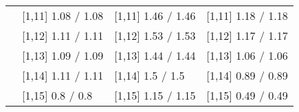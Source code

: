\begin{table}
\begin{tabular}[t]{llll}
 & {}[1,11] 1.08  / 1.08 & {}[1,11] 1.46  / 1.46 & {}[1,11] 1.18  / 1.18\\
 & {}[1,12] 1.11  / 1.11 & {}[1,12] 1.53  / 1.53 & {}[1,12] 1.17  / 1.17\\
\addlinespace
 & {}[1,13] 1.09  / 1.09 & {}[1,13] 1.44  / 1.44 & {}[1,13] 1.06  / 1.06\\
 & {}[1,14] 1.11  / 1.11 & {}[1,14] 1.5  / 1.5 & {}[1,14] 0.89  / 0.89\\
 & {}[1,15] 0.8  / 0.8 & {}[1,15] 1.15  / 1.15 & {}[1,15] 0.49  / 0.49\\
\bottomrule
\end{tabular}
\end{table}
